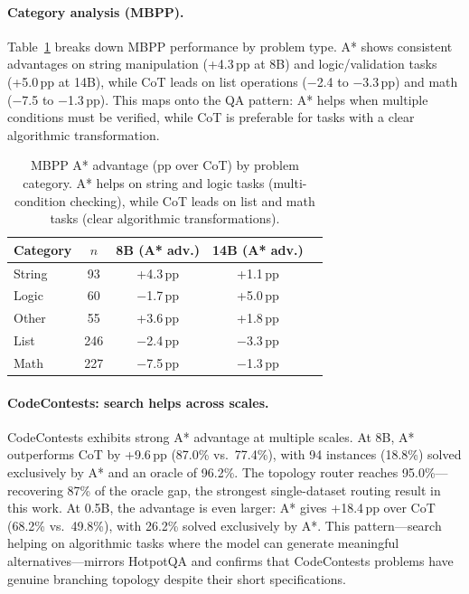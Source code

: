 \documentclass[10pt]{article}
\begin{document}
{\paragraph{Category analysis (MBPP).}
Table~\ref{tab:code_categories} breaks down MBPP performance by problem type. A* shows consistent advantages on string manipulation (+4.3\,pp at 8B) and logic/validation tasks (+5.0\,pp at 14B), while CoT leads on list operations ($-$2.4 to $-$3.3\,pp) and math ($-$7.5 to $-$1.3\,pp). This maps onto the QA pattern: A* helps when multiple conditions must be verified, while CoT is preferable for tasks with a clear algorithmic transformation.

\begin{table}[ht]
\centering
\small
\begin{tabular}{lcccc}
\toprule
\textbf{Category} & \textbf{$n$} & \textbf{8B (A* adv.)} & \textbf{14B (A* adv.)} \\
\midrule
String      & 93  & +4.3\,pp & +1.1\,pp \\
Logic       & 60  & $-$1.7\,pp & +5.0\,pp \\
Other       & 55  & +3.6\,pp & +1.8\,pp \\
List        & 246 & $-$2.4\,pp & $-$3.3\,pp \\
Math        & 227 & $-$7.5\,pp & $-$1.3\,pp \\
\bottomrule
\end{tabular}
\caption{MBPP A* advantage (pp over CoT) by problem category. A* helps on string and logic tasks (multi-condition checking), while CoT leads on list and math tasks (clear algorithmic transformations).}
\label{tab:code_categories}
\end{table}

\paragraph{CodeContests: search helps across scales.}
CodeContests exhibits strong A* advantage at multiple scales. At 8B, A* outperforms CoT by +9.6\,pp (87.0\% vs.\ 77.4\%), with 94 instances (18.8\%) solved exclusively by A* and an oracle of 96.2\%. The topology router reaches 95.0\%---recovering 87\% of the oracle gap, the strongest single-dataset routing result in this work. At 0.5B, the advantage is even larger: A* gives +18.4\,pp over CoT (68.2\% vs.\ 49.8\%), with 26.2\% solved exclusively by A*. This pattern---search helping on algorithmic tasks where the model can generate meaningful alternatives---mirrors HotpotQA and confirms that CodeContests problems have genuine branching topology despite their short specifications.

}
\end{document}
